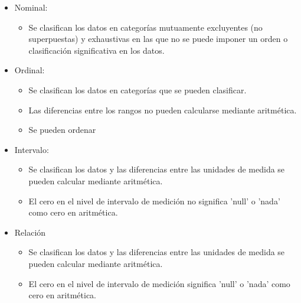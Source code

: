 \begin{itemize}
\item Nominal:
	\begin{itemize}
	\item Se clasifican los datos en categorías mutuamente excluyentes (no superpuestas) y exhaustivas en las que no se puede imponer un orden o clasificación significativa en los datos. 
	\end{itemize}
		
\item Ordinal:
	\begin{itemize}
	\item Se clasifican los datos en categorías que se pueden clasificar. 
	\item Las diferencias entre los rangos no pueden calcularse mediante aritmética.
	\item Se pueden ordenar
	\end{itemize}		

\item Intervalo: 
	\begin{itemize}
	\item Se clasifican los datos y las diferencias entre las unidades de medida se pueden calcular mediante aritmética. 
	\item El cero en el nivel de intervalo de medición no significa 'null' o 'nada' como cero en aritmética.
	\end{itemize}		

\item Relación
	\begin{itemize}
	\item Se clasifican los datos y las diferencias entre las unidades de medida se pueden calcular mediante aritmética. 
	\item El cero en el nivel de intervalo de medición significa 'null' o 'nada' como cero en aritmética.
	\end{itemize}
		
\end{itemize}